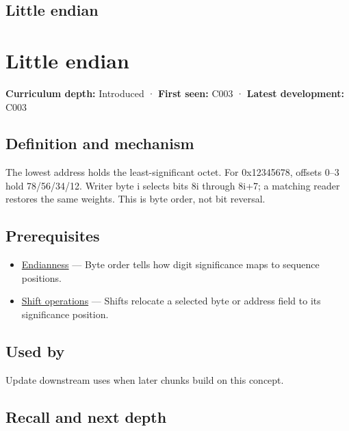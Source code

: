 \hypertarget{appendix-367b6abf460e}{}
\section*{Little endian}
\chapter{Little endian}\label{appendix-367b6abf460e-little-endian}

\textbf{Curriculum depth:} Introduced · \textbf{First seen:} C003 · \textbf{Latest development:} C003

\section{Definition and mechanism}\label{appendix-367b6abf460e-definition-and-mechanism}

The lowest address holds the least-significant octet. For 0x12345678, offsets 0--3 hold 78/56/34/12. Writer byte i selects bits 8i through 8i+7; a matching reader restores the same weights. This is byte order, not bit reversal.

\section{Prerequisites}\label{appendix-367b6abf460e-prerequisites}

\begin{itemize}
\tightlist
\item
  \hyperref[appendix-bc07c3d25b18]{Endianness} --- Byte order tells how digit significance maps to sequence positions.
\item
  \hyperref[appendix-73425b25118e]{Shift operations} --- Shifts relocate a selected byte or address field to its significance position.
\end{itemize}

\section{Used by}\label{appendix-367b6abf460e-used-by}

Update downstream uses when later chunks build on this concept.

\section{Recall and next depth}\label{appendix-367b6abf460e-recall-and-next-depth}

